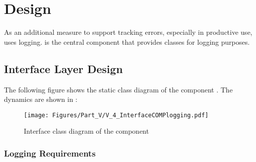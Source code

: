 
\section{\COMPlogging{} Design}
\label{sec:COMPloggingDesign}

As an additional measure to support tracking errors, especially in productive use, \LibName{} uses logging. \COMPlogging{} is the central component that provides classes for logging purposes.


\subsection{Interface Layer Design}
\label{sec:InterfaceDesignCOMPlogging}

The following figure shows the static class diagram of the component \COMPlogging{}. The dynamics are shown in :

\begin{figure}[H]
	\centering
	\texttt{[image: Figures/Part\_V/V\_4\_InterfaceCOMPlogging.pdf]}
	\caption{Interface class diagram of the component \COMPlogging{}}
	\label{fig:V_4_InterfaceCOMPlogging}
\end{figure}


\subsubsection{Logging Requirements}
\label{sec:ComponentFeatures}

\newcommand{\REQUlogLevelConfig}{REQU\_LOG\_LEVEL\_CONFIG}
\newcommand{\REQUlogFilePathConfig}{REQU\_LOG\_FILE\_PATH\_CONFIG}
\newcommand{\REQUlogForcedLogging}{REQU\_LOG\_FORCED\_LOGGING}
\newcommand{\REQUlogNoMissedRecords}{REQU\_NO\_MISSED\_RECORDS}
\newcommand{\REQUlogOneLogfile}{REQU\_LOG\_ONE\_LOGFILE}
\newcommand{\REQUlogUniLayout}{REQU\_LOG\_UNIFORM\_LAYOUT}
\newcommand{\REQUlogSearchPatterns}{REQU\_LOG\_SEARCH\_PATTERNS}
\newcommand{\REQUlogAnalysisInformation}{REQU\_LOG\_ANALYSIS\_INFORMATION}
\newcommand{\REQUlogPreparedLocalisation}{REQU\_LOG\_LOCALISATION}
\newcommand{\REQUlogTestability}{REQU\_LOG\_TESTABILITY}

